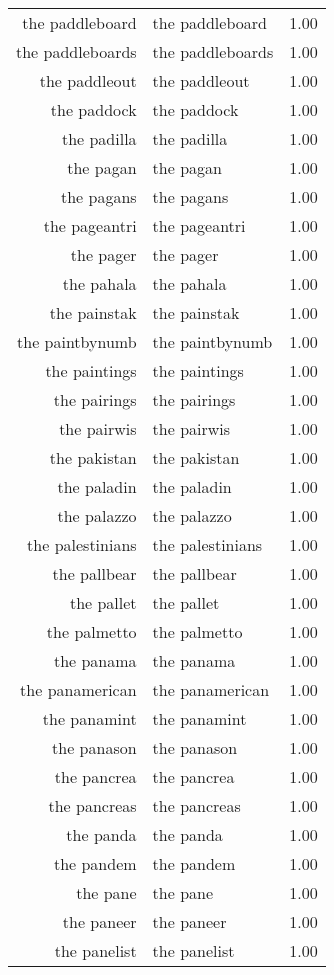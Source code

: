 \begin{table}[ht]
\begin{tabular}{rlr}
  the paddleboard & the paddleboard & 1.00 \\ 
  the paddleboards & the paddleboards & 1.00 \\ 
  the paddleout & the paddleout & 1.00 \\ 
  the paddock & the paddock & 1.00 \\ 
  the padilla & the padilla & 1.00 \\ 
  the pagan & the pagan & 1.00 \\ 
  the pagans & the pagans & 1.00 \\ 
  the pageantri & the pageantri & 1.00 \\ 
  the pager & the pager & 1.00 \\ 
  the pahala & the pahala & 1.00 \\ 
  the painstak & the painstak & 1.00 \\ 
  the paintbynumb & the paintbynumb & 1.00 \\ 
  the paintings & the paintings & 1.00 \\ 
  the pairings & the pairings & 1.00 \\ 
  the pairwis & the pairwis & 1.00 \\ 
  the pakistan & the pakistan & 1.00 \\ 
  the paladin & the paladin & 1.00 \\ 
  the palazzo & the palazzo & 1.00 \\ 
  the palestinians & the palestinians & 1.00 \\ 
  the pallbear & the pallbear & 1.00 \\ 
  the pallet & the pallet & 1.00 \\ 
  the palmetto & the palmetto & 1.00 \\ 
  the panama & the panama & 1.00 \\ 
  the panamerican & the panamerican & 1.00 \\ 
  the panamint & the panamint & 1.00 \\ 
  the panason & the panason & 1.00 \\ 
  the pancrea & the pancrea & 1.00 \\ 
  the pancreas & the pancreas & 1.00 \\ 
  the panda & the panda & 1.00 \\ 
  the pandem & the pandem & 1.00 \\ 
  the pane & the pane & 1.00 \\ 
  the paneer & the paneer & 1.00 \\ 
  the panelist & the panelist & 1.00 \\ 

\end{tabular}
\end{table}
